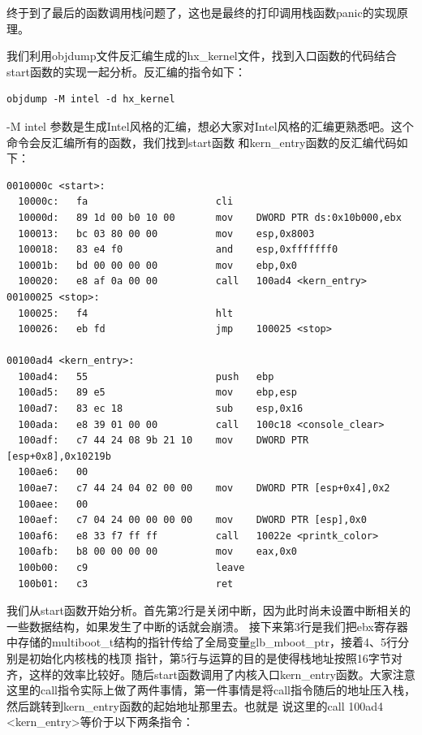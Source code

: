 \par 终于到了最后的函数调用栈问题了，这也是最终的打印调用栈函数panic的实现原理。

\par 我们利用objdump文件反汇编生成的hx\_kernel文件，找到入口函数的代码结合start函数的实现一起分析。反汇编的指令如下：

\begin{Verbatim}[frame=single]
  objdump -M intel -d hx_kernel
\end{Verbatim}

\par -M intel 参数是生成Intel风格的汇编，想必大家对Intel风格的汇编更熟悉吧。这个命令会反汇编所有的函数，我们找到start函数\allowbreak
和kern\_entry函数的反汇编代码如下：

\begin{lstlisting}[language = {[x86masm]Assembler}, caption = 入口函数反汇编]
0010000c <start>:
  10000c:	fa                   	cli    
  10000d:	89 1d 00 b0 10 00    	mov    DWORD PTR ds:0x10b000,ebx
  100013:	bc 03 80 00 00       	mov    esp,0x8003
  100018:	83 e4 f0             	and    esp,0xfffffff0
  10001b:	bd 00 00 00 00       	mov    ebp,0x0
  100020:	e8 af 0a 00 00       	call   100ad4 <kern_entry>
00100025 <stop>:
  100025:	f4                   	hlt    
  100026:	eb fd                	jmp    100025 <stop>

00100ad4 <kern_entry>:
  100ad4:	55                   	push   ebp
  100ad5:	89 e5                	mov    ebp,esp
  100ad7:	83 ec 18             	sub    esp,0x16
  100ada:	e8 39 01 00 00       	call   100c18 <console_clear>
  100adf:	c7 44 24 08 9b 21 10 	mov    DWORD PTR [esp+0x8],0x10219b
  100ae6:	00 
  100ae7:	c7 44 24 04 02 00 00 	mov    DWORD PTR [esp+0x4],0x2
  100aee:	00 
  100aef:	c7 04 24 00 00 00 00 	mov    DWORD PTR [esp],0x0
  100af6:	e8 33 f7 ff ff       	call   10022e <printk_color>
  100afb:	b8 00 00 00 00       	mov    eax,0x0
  100b00:	c9                   	leave  
  100b01:	c3                   	ret    
\end{lstlisting}

\par 我们从start函数开始分析。首先第2行是关闭中断，因为此时尚未设置中断相关的一些数据结构，如果发生了中断的话就会崩溃。\allowbreak
接下来第3行是我们把ebx寄存器中存储的multiboot\_t结构的指针传给了全局变量glb\_mboot\_ptr，接着4、5行分别是初始化内核栈的栈顶\allowbreak
指针，第5行与运算的目的是使得栈地址按照16字节对齐，这样的效率比较好。随后start函数调用了内核入口kern\_entry函数。大家注意\allowbreak
这里的call指令实际上做了两件事情，第一件事情是将call指令随后的地址压入栈，然后跳转到kern\_entry函数的起始地址那里去。也就是\allowbreak
说这里的call 100ad4 <kern\_entry>等价于以下两条指令：

